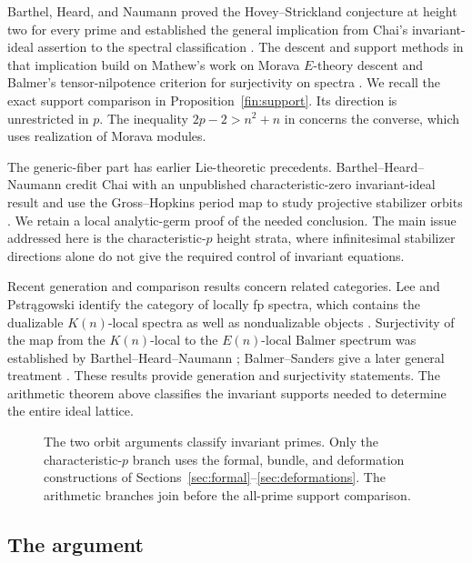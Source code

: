 Barthel, Heard, and Naumann proved the Hovey--Strickland conjecture at
height two for every prime and established the general implication from
Chai's invariant-ideal assertion to the spectral classification
\cite[Theorems~4.9 and~4.15]{BHN22}.  The descent and support methods in
that implication build on Mathew's work on Morava \(E\)-theory descent
\cite{Mathew16} and Balmer's tensor-nilpotence criterion for surjectivity
on spectra \cite{Balmer18}.  We recall the exact support comparison in
Proposition~\ref{fin:support}.  Its direction is unrestricted in \(p\).
The inequality \(2p-2>n^2+n\) in \cite[Theorem~4.13]{BHN22}
concerns the converse, which uses realization of Morava modules.

The generic-fiber part has earlier Lie-theoretic precedents.
Barthel--Heard--Naumann credit Chai with an unpublished
characteristic-zero invariant-ideal result and use the Gross--Hopkins period map to study
projective stabilizer orbits
\cite[Remark~4.2 and Proposition~4.18]{BHN22}.
We retain a local analytic-germ proof of the needed conclusion.
The main issue addressed here is the characteristic-\(p\) height
strata, where infinitesimal stabilizer directions alone do not give
the required control of invariant equations.

Recent generation and comparison results concern related categories.
Lee and Pstr{\k a}gowski identify the category of locally fp spectra,
which contains the dualizable \(K(n)\)-local spectra as well as
nondualizable objects
\cite[Example~1.6 and Theorems~1.7--1.9]{LP26}.
Surjectivity of the map from the \(K(n)\)-local to the \(E(n)\)-local
Balmer spectrum was established by Barthel--Heard--Naumann
\cite[Remark~3.6]{BHN22}; Balmer--Sanders give a later general treatment
\cite[Proposition~8.11 and Remark~8.13]{BalmerSanders}.
These results provide generation and surjectivity statements.
The arithmetic theorem above classifies the invariant supports needed
to determine the entire ideal lattice.

\begin{figure}[htbp]
\centering

\caption{The two orbit arguments classify invariant primes.  Only the
characteristic-\(p\) branch uses the formal, bundle, and deformation
constructions of Sections~\ref{sec:formal}--\ref{sec:deformations}.
The arithmetic branches join before the all-prime support comparison.}
\label{fig:proof-flow}
\end{figure}

\subsection{The argument}

